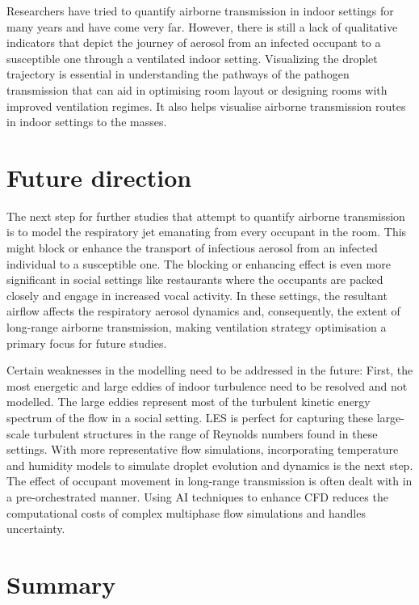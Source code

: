 \documentclass[preprint,12pt]{elsarticle}
\begin{document}
Researchers have tried to quantify airborne transmission in indoor settings for many years and have come very far. However, there is still a lack of qualitative indicators that depict the journey of aerosol from an infected occupant to a susceptible one through a ventilated indoor setting. Visualizing the droplet trajectory is essential in understanding the pathways of the pathogen transmission that can aid in optimising room layout or designing rooms with improved ventilation regimes. It also helps visualise airborne transmission routes in indoor settings to the masses.

\section{Future direction}

The next step for further studies that attempt to quantify airborne transmission is to model the respiratory jet emanating from every occupant in the room. This might block or enhance the transport of infectious aerosol from an infected individual to a susceptible one. The blocking or enhancing effect is even more significant in social settings like restaurants where the occupants are packed closely and engage in increased vocal activity. In these settings, the resultant airflow affects the respiratory aerosol dynamics and, consequently, the extent of long-range airborne transmission, making ventilation strategy optimisation a primary focus for future studies.

Certain weaknesses in the modelling need to be addressed in the future: First, the most energetic and large eddies of indoor turbulence need to be resolved and not modelled. The large eddies represent most of the turbulent kinetic energy spectrum of the flow in a social setting. LES is perfect for capturing these large-scale turbulent structures in the range of Reynolds numbers found in these settings. With more representative flow simulations, incorporating temperature and humidity models to simulate droplet evolution and dynamics is the next step. The effect of occupant movement in long-range transmission is often dealt with in a pre-orchestrated manner. Using AI techniques to enhance CFD reduces the computational costs of complex multiphase flow simulations and handles uncertainty.

\section{Summary}
\end{document}
